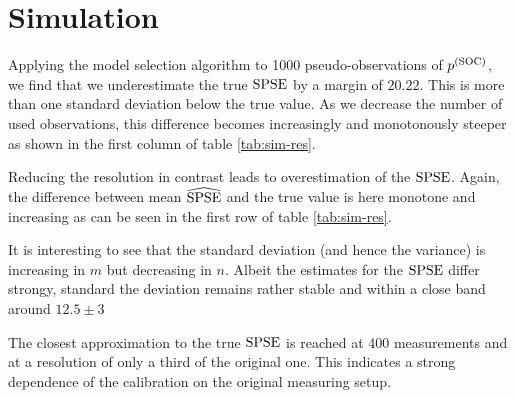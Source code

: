 \section{Simulation}
\label{sec:simulation}
	
	Applying the model selection algorithm to 1000 pseudo-observations of $p^{(\mathrm{SOC})}$, we find that we underestimate the true $\mathrm{SPSE}$ by a margin of $20.22$. 
	This is more than one standard deviation below the true value.
	As we decrease the number of used observations, this difference becomes increasingly and monotonously steeper as shown in the first column of table \ref{tab:sim-res}.
		
	
	
	Reducing the resolution in contrast leads to overestimation of the $\mathrm{SPSE}$.
	Again, the difference between mean $\widehat{\mathrm{SPSE}}$ and the true value is here monotone and increasing as can be seen in the first row of table \ref{tab:sim-res}.
	
	It is interesting to see that the standard deviation (and hence the variance) is increasing in $m$ but decreasing in $n$.
	Albeit the estimates for the $\mathrm{SPSE}$ differ strongy, standard the deviation remains rather stable and within a close band around $12.5 \pm 3$
	
	The closest approximation to the true $\mathrm{SPSE}$ is reached at 400 measurements and at a resolution of only a third of the original one.
	This indicates a strong dependence of the calibration on the original measuring setup.

